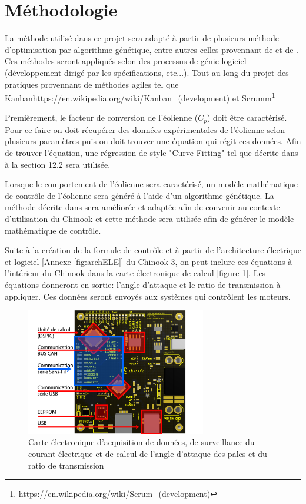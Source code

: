 \documentclass[11pt]{article}
\begin{document}
\section{Méthodologie}

La méthode utilisé dans ce projet sera adapté à partir de plusieurs méthode d'optimisation par algorithme génétique, entre autres celles provennant de \cite{GeneticField} et de \cite{Ouissam12}. Ces méthodes seront appliqués selon des processus de génie logiciel (développement dirigé par les spécifications, etc...). Tout au long du projet des pratiques provennant de méthodes agiles tel que Kanban{\url{https://en.wikipedia.org/wiki/Kanban_(development)}} et Scrumm\footnote{\url{https://en.wikipedia.org/wiki/Scrum_(development)}} 

Premièrement, le facteur de conversion de l'éolienne ($C_p$) doit être caractérisé. Pour ce faire on doit récupérer des données expérimentales de l'éolienne selon plusieurs paramètres puis on doit trouver une équation qui régit ces données. Afin de trouver l'équation, une régression de style "Curve-Fitting" tel que décrite dans \cite{GeneticField} à la section 12.2 sera utilisée.

Lorsque le comportement de l'éolienne sera caractérisé, un modèle mathématique de contrôle de l'éolienne sera généré à l'aide d'un algorithme génétique. La méthode décrite dans \cite{Ouissam12} sera améliorée et adaptée afin de convenir au contexte d'utilisation du Chinook et cette méthode sera utilisée afin de générer le modèle mathématique de contrôle.

Suite à la création de la formule de contrôle et à partir de l'architecture électrique et logiciel [Annexe \ref{fig:archELE}] du Chinook 3, on peut inclure ces équations à l'intérieur du Chinook dans la carte électronique de calcul [figure \ref{fig:carteElec}]. Les équations donneront en sortie: l'angle d'attaque et le ratio de transmission à appliquer. Ces données seront envoyés aux systèmes qui contrôlent les moteurs.

\begin{figure}[H]
  \centering
  \includegraphics[width=0.7\textwidth]{images/3d-top-annoté.pdf}
  \caption[Carte électronique de calcul]{Carte électronique d'acquisition de données, de surveillance du courant électrique et de calcul de l'angle d'attaque des pales et du ratio de transmission}
  \label{fig:carteElec}
\end{figure}
\end{document}
